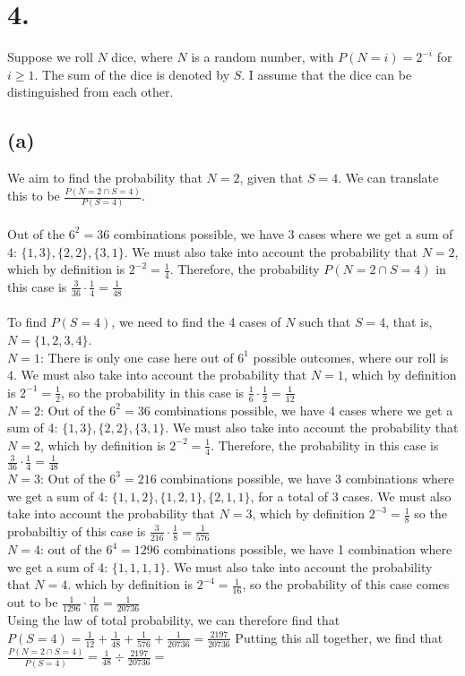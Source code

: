 \documentclass{article}
\begin{document}
\section*{4.}
{\Large 
Suppose we roll $N$ dice, where $N$ is a random number, with $P(N = i) = 2^{-i}$ for $i \geq 1$. The sum of the dice is denoted by $S$. I assume that the dice can be distinguished from each other.

\subsection*{(a)}
We aim to find the probability that $N = 2$, given that $S = 4$. We can translate this to be $\frac{P(N = 2 \cap S = 4)}{P(S = 4)}$. \\ \\
Out of the $6^2 = 36$ combinations possible, we have 3 cases where we get a sum of 4: $\{1, 3\}, \{2, 2\}, \{3, 1\}$. We must also take into account the probability that $N = 2$, which by definition is $2^{-2} = \frac{1}{4}$. Therefore, the probability $P(N = 2 \cap S = 4)$ in this case is $\frac{3}{36} \cdot \frac{1}{4} = \frac{1}{48}$\\ \\ 
To find $P(S = 4)$, we need to find the 4 cases of $N$ such that $S = 4$, that is, $N = \{1, 2, 3, 4\}$. \\
$N = 1$: There is only one case here out of $6^1$ possible outcomes, where our roll is ${4}$. We must also take into account the probability that $N = 1$, which by definition is $2^{-1} = \frac{1}{2}$, so the probability in this case is $\frac{1}{6} \cdot \frac{1}{2} = \frac{1}{12}$ \\ 
$N = 2$: Out of the $6^2 = 36$ combinations possible, we have 4 cases where we get a sum of 4: $\{1, 3\}, \{2, 2\}, \{3, 1\}$. We must also take into account the probability that $N = 2$, which by definition is $2^{-2} = \frac{1}{4}$. Therefore, the probability in this case is $\frac{3}{36} \cdot \frac{1}{4} = \frac{1}{48}$ \\ 
$N = 3$: Out of the $6^3 = 216$ combinations possible, we have 3 combinations where we get a sum of 4: $\{1, 1, 2\}, \{1, 2, 1\}, \{2, 1, 1\}$, for a total of 3 cases. We must also take into account the probability that $N = 3$, which by definition $2^{-3} = \frac{1}{8}$ so the probabiltiy of this case is $\frac{3}{216} \cdot \frac{1}{8} = \frac{1}{576}$ \\ 
$N = 4$: out of the $6^4 = 1296$ combinations possible, we have 1 combination where we get a sum of 4: $\{1, 1, 1, 1\}$. We must also take into account the probability that $N = 4$. which by definition is $2^{-4} = \frac{1}{16}$, so the probability of this case comes out to be $\frac{1}{1296} \cdot \frac{1}{16} = \frac{1}{20736}$ \\ 
Using the law of total probability, we can therefore find that $P(S = 4) = \frac{1}{12} + \frac{1}{48} + \frac{1}{576} + \frac{1}{20736} = \frac{2197}{20736}$
Putting this all together, we find that $\frac{P(N = 2 \cap S = 4)}{P(S = 4)} = \frac{1}{48} \div \frac{2197}{20736} =$ 

}
\end{document}

